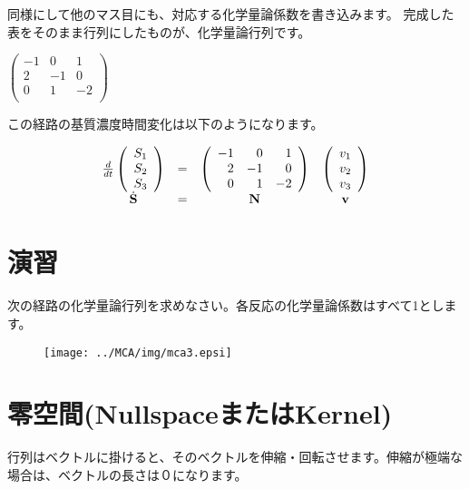 同様にして他のマス目にも、対応する化学量論係数を書き込みます。
完成した表をそのまま行列にしたものが、化学量論行列です。
\begin{center}
\(
\left(
\begin{array}{rrr}
 -1  &  0  & 1 \\
  2  &  -1 & 0 \\
  0  &  1 & -2\\ 
\end{array}
\right)
\)
\end{center}

この経路の基質濃度時間変化は以下のようになります。

\[
\begin{array}{cccc}
\frac{d}{dt}
\left(
\begin{array}{l}
S_1 \\
S_2 \\
S_3 \\ 
\end{array}
\right)
& = &
\left(
\begin{array}{rrr}
 -1  &  0  & 1 \\
  2  &  -1 & 0 \\
  0  &  1 & -2\\ 
\end{array}
\right)
&
\left(
\begin{array}{l}
v_1 \\
v_2 \\
v_3 \\ 
\end{array}
\right)\\
\dot{\bf S} & = & {\bf N} & {\bf v} \\
\end{array}
\]

\section{演習}
次の経路の化学量論行列を求めなさい。各反応の化学量論係数はすべて1とします。
\begin{figure}[h]
\begin{center}
\texttt{[image: ../MCA/img/mca3.epsi]}
\end{center}
\end{figure}

\section{零空間(NullspaceまたはKernel)}
行列はベクトルに掛けると、そのベクトルを伸縮・回転させます。伸縮が極端な場合は、ベクトルの長さは０になります。



